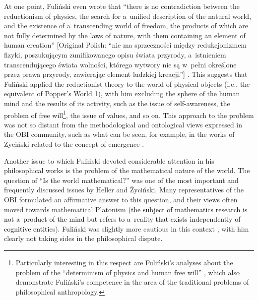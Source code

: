 At one point, Fuliński even wrote that ``there is no contradiction between the reductionism of physics, the search for a~unified description of the natural world, and the existence of a~transcending world of freedom, the products of which are not fully determined by the laws of nature, with them containing an element of human creation'' [Original Polish: ``nie ma sprzeczności między redukcjonizmem fizyki, poszukującym zunifikowanego opisu świata przyrody, a~istnieniem transcendującego świata wolności, którego wytwory nie są w~pełni określone przez prawa przyrody, zawierając element ludzkiej kreacji.''] 
\parencite[][p.47]{fulinski_o_1993}. %
 This suggests that Fuliński applied the reductionist theory to the world of physical objects (i.e., the equivalent of Popper's World 1), with him excluding the sphere of the human mind and the results of its activity, such as the issue of self-awareness, the problem of free will\footnote{Particularly interesting in this respect are Fuliński's analyses about the problem of the ``determinism of physics and human free will'' 
\parencites[see e.g][]{janik_fizyka_1998}[][]{wojtowicz_determinizm_2005}, %
 which also demonstrate Fuliński's competence in the area of the traditional problems of philosophical anthropology.}, the issue of values, and so on. This approach to the problem was not so distant from the methodological and ontological views expressed in the OBI community, such as what can be seen, for example, in the works of Życiński related to the concept of emergence 
\parencite[e.g][]{zycinski_wszechswiat_2009}.%




Another issue to which Fuliński devoted considerable attention in his philosophical works is the problem of the mathematical nature of the world. The question of ``Is the world mathematical?'' was one of the most important and frequently discussed issues by Heller and Życiński. Many representatives of the OBI formulated an affirmative answer to this question, and their views often moved towards mathematical Platonism (\textcolor{black}{the subject of mathematics research is not a~product of the mind but refers to a~reality that exists independently of cognitive entities}). Fuliński was slightly more cautious in this context 
\parencite[e.g][]{janik_glos_1990}, %
 with him clearly not taking sides in the philosophical dispute.



